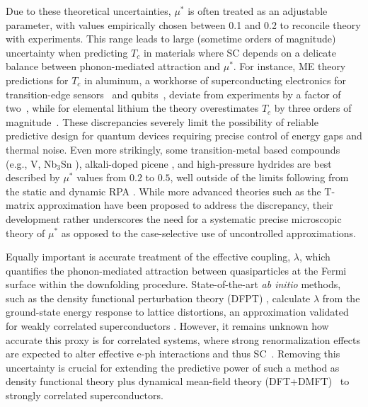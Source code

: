 \documentclass[%
 reprint,
superscriptaddress,
 amsmath,amssymb,
 aps,
prx,
]{revtex4-2}
\begin{document}
Due to these theoretical uncertainties, $\mu^*$ is often treated as an adjustable parameter, with values empirically chosen between 0.1 and 0.2 to reconcile theory with experiments. This range leads to large (sometime orders of magnitude) uncertainty when predicting $T_c$ in materials where SC depends on a delicate balance between phonon-mediated attraction and $\mu^*$.  For instance, ME theory predictions for $T_c$ in aluminum, a workhorse of superconducting electronics for transition-edge sensors~\cite{irwin_transition-edge_2005} and qubits~\cite{qubit_poisoning}, deviate from experiments by a factor of two~\cite{pellegrini2024ab}, while 
for elemental lithium the theory overestimates $T_c$ by three orders of magnitude~\cite{ashcroft1,hubbard_mu, tuoriniemi_superconductivity_2007}. These discrepancies severely limit the possibility of reliable predictive
design for quantum devices requiring precise control of energy gaps and thermal noise. Even more strikingly, some transition-metal based compounds (e.g., V, Nb$_3$Sn \cite{RevModPhys.62.1027}), alkali-doped picene \cite{PhysRevB.84.020508}, and high-pressure hydrides \cite{kostrzewa_anomalously_2018} are best described by 
$\mu^*$ values from $0.2$ to $0.5$, well outside of the limits following from the static \cite{morel_anderson} and dynamic RPA \cite{margine2016electron,RPA_mu,RPA_mu2}. While more advanced theories such as the T-matrix approximation \cite{scalapino1969electron, gladstone2018superconductivity} have been proposed to address the discrepancy, their development rather underscores the need for a systematic precise microscopic theory of $\mu^*$ as opposed to the case-selective use of uncontrolled approximations. 

Equally important is accurate treatment of the effective coupling, $\lambda$, which quantifies the phonon-mediated attraction between quasiparticles at the Fermi surface within the downfolding procedure. 
State-of-the-art \emph{ab initio} methods, such as the density functional perturbation theory (DFPT) \cite{giustino_2017,EPW1, EPW2, AEPW, pellegrini2024ab}, calculate $\lambda$ from the ground-state energy response to lattice distortions, an approximation validated for weakly correlated superconductors \cite{RAINER1986371}. However, it remains unknown 
how accurate this proxy is for correlated systems, where strong renormalization effects are expected to alter effective e-ph interactions and thus SC~\cite{RPA_mu,RPA_mu2,zfactor_2022,23tao}. Removing this uncertainty is crucial for extending the predictive power
of such a method as density functional theory plus dynamical mean-field theory (DFT+DMFT)~\cite{dftdmft1,dftdmft2,dftdmft3,dftdmft4,dftdmft5,dftdmftreview,dmft_sc1,dmft_sc2} to strongly correlated superconductors. 
\end{document}
